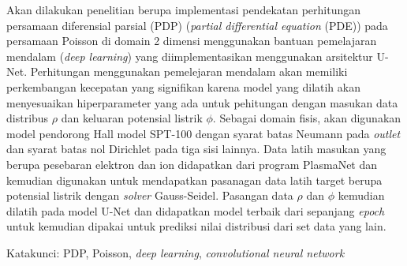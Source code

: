 \documentclass{laporanta1actugm}
\begin{document}
\cover

\newpage{}
\tableofcontents
\begin{abstractind}
Akan dilakukan penelitian berupa implementasi pendekatan perhitungan persamaan diferensial parsial (PDP) (\emph{partial differential equation} (PDE)) pada persamaan Poisson di domain 2 dimensi menggunakan bantuan pemelajaran mendalam (\emph{deep learning}) yang diimplementasikan menggunakan arsitektur U-Net. Perhitungan menggunakan pemelejaran mendalam akan memiliki perkembangan kecepatan yang signifikan karena model yang dilatih akan menyesuaikan hiperparameter yang ada untuk pehitungan dengan masukan data distribus $\rho$ dan keluaran potensial listrik $\phi$. Sebagai domain fisis, akan digunakan model pendorong Hall model SPT-100 dengan syarat batas Neumann pada \emph{outlet} dan syarat batas nol Dirichlet pada tiga sisi lainnya. Data latih masukan yang berupa pesebaran elektron dan ion didapatkan dari program PlasmaNet dan kemudian digunakan untuk mendapatkan pasanagan data latih target berupa potensial listrik dengan \emph{solver} Gauss-Seidel. Pasangan data $\rho$ dan $\phi$ kemudian dilatih pada model U-Net dan didapatkan model terbaik dari sepanjang \emph{epoch} untuk kemudian dipakai untuk prediksi nilai distribusi dari set data yang lain.

Katakunci: PDP, Poisson, \emph{deep learning}, \emph{convolutional neural network}
\end{abstractind}







\end{document}
